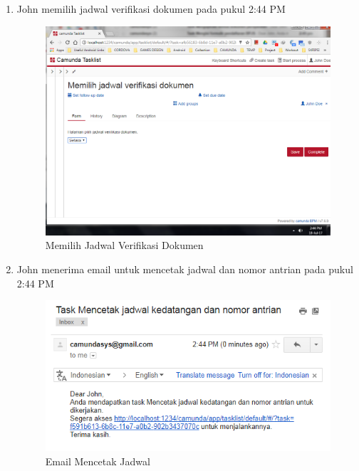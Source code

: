 \begin{enumerate}
	\item John memilih jadwal verifikasi dokumen pada pukul 2:44 PM
			\begin{figure}[H]
			\centering
			\includegraphics[scale=0.5]{Gambar/Bab-5/kasus2/9}
			\caption{Memilih Jadwal Verifikasi Dokumen} 
			\label{fig:pengujian_kasus2_9}
	\end{figure}
	

	\item John menerima email untuk mencetak jadwal dan nomor antrian pada pukul 2:44 PM
			\begin{figure}[H]
			\centering
			\includegraphics[scale=0.8]{Gambar/Bab-5/kasus2/10}
			\caption{Email Mencetak Jadwal} 
			\label{fig:pengujian_kasus2_10}
	\end{figure}
	


\end{enumerate}
